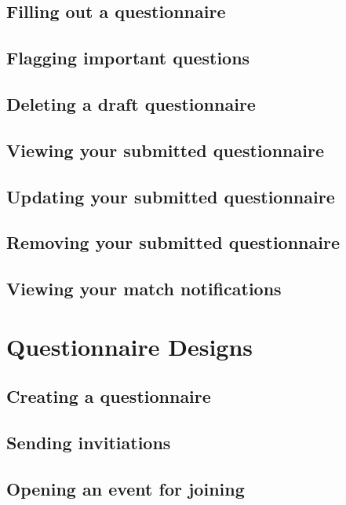 \documentclass[a4paper,11pt,titlepage]{scrartcl}
\begin{document}
\subsection{Filling out a questionnaire}

\subsection{Flagging important questions}

\subsection{Deleting a draft questionnaire}

\subsection{Viewing your submitted questionnaire}

\subsection{Updating your submitted questionnaire}

\subsection{Removing your submitted questionnaire}

\subsection{Viewing your match notifications}

\clearpage
\section{Questionnaire Designs}

\subsection{Creating a questionnaire}

\subsection{Sending invitiations}

\subsection{Opening an event for joining}
\end{document}
